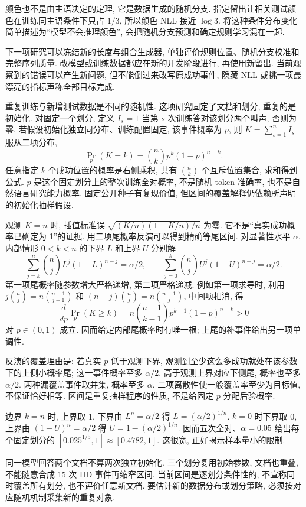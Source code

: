 颜色也不是由主语决定的定理, 它是数据生成的随机分支. 指定留出让相关测试颜色在训练同主语条件下只占 $1/3$, 所以颜色 NLL 接近 $\log3$. 将这种条件分布变化简单描述为“模型不会推理颜色”, 会把随机分支预测和确定规则学习混在一起.

下一项研究可以冻结新的长度与组合生成器, 单独评价规则位置、随机分支校准和完整序列质量. 改模型或训练数据都应在新的开发阶段进行, 再使用新留出. 当前观察到的错误可以产生新问题, 但不能倒过来改写原成功事件, 隐藏 NLL 或挑一项最漂亮的指标声称全部目标完成.

\label{sec:micro-ci}
重复训练与新增测试数据是不同的随机性. 这项研究固定了文档和划分, 重复的是初始化. 对固定一个划分, 定义 $I_s=1$ 当第 $s$ 次训练答对该划分两个叫声, 否则为零. 若假设初始化独立同分布、训练配置固定, 该事件概率为 $p$, 则 $K=\sum_{s=1}^n I_s$ 服从二项分布,
\[
\Pr_p(K=k)=\binom nkp^k(1-p)^{n-k}.
\]
任意指定 $k$ 个成功位置的概率是右侧乘积, 共有 $\binom nk$ 个互斥位置集合, 求和得到公式. $p$ 是这个固定划分上的整次训练全对概率, 不是随机 token 准确率, 也不是自然语言研究能力概率. 固定公开种子有复现价值, 但区间的覆盖解释仍依赖所声明的初始化抽样假设.

观测 $K=n$ 时, 插值标准误 $\sqrt{(K/n)(1-K/n)/n}$ 为零. 它不是“真实成功概率已确定为 1”的证据. 用二项尾概率反演可以得到精确等尾区间\cite{nist-ci}. 对显著性水平 $\alpha$, 内部情形 $0<k<n$ 的下界 $L$ 和上界 $U$ 分别解
\[
\sum_{j=k}^n\binom njL^j(1-L)^{n-j}=\alpha/2,\qquad
\sum_{j=0}^k\binom njU^j(1-U)^{n-j}=\alpha/2.
\]
第一项尾概率随参数增大严格递增, 第二项严格递减. 例如第一项求导时, 利用 $j\binom nj=n\binom{n-1}{j-1}$ 和 $(n-j)\binom nj=n\binom{n-1}{j}$, 中间项相消, 得
\[
\frac d{dp}\Pr_p(K\ge k)=n\binom{n-1}{k-1}p^{k-1}(1-p)^{n-k}>0
\]
对 $p\in(0,1)$ 成立. 因而给定内部尾概率时有唯一根; 上尾的补事件给出另一项单调性.

反演的覆盖理由是: 若真实 $p$ 低于观测下界, 观测到至少这么多成功就处在该参数下的上侧小概率尾; 这一事件概率至多 $\alpha/2$. 高于观测上界对应下侧尾, 概率也至多 $\alpha/2$. 两种漏覆盖事件取并集, 概率至多 $\alpha$. 二项离散性使一般覆盖率至少为目标值, 不保证恰好相等. 区间是重复抽样程序的性质, 不是给固定 $p$ 分配后验概率.

边界 $k=n$ 时, 上界取 1, 下界由 $L^n=\alpha/2$ 得 $L=(\alpha/2)^{1/n}$. $k=0$ 时下界取 0, 上界由 $(1-U)^n=\alpha/2$ 得 $U=1-(\alpha/2)^{1/n}$. 因而五次全对、$\alpha=0.05$ 给出每个固定划分的 $[0.025^{1/5},1]\approx[0.4782,1]$. 这很宽, 正好揭示样本量小的限制.

同一模型回答两个文档不算两次独立初始化. 三个划分复用初始参数, 文档也重叠, 不能随意合成 15 次 IID 事件再缩窄区间. 当前区间是逐划分条件性的, 不宣称同时覆盖所有划分, 也不评价任意新文档. 要估计新的数据分布或划分策略, 必须按对应随机机制采集新的重复对象.

